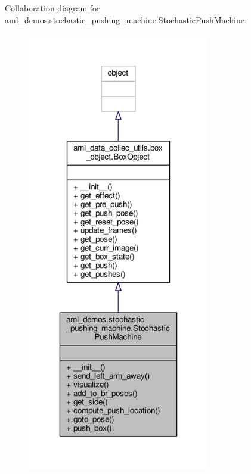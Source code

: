 Collaboration diagram for aml\-\_\-demos.\-stochastic\-\_\-pushing\-\_\-machine.\-Stochastic\-Push\-Machine\-:
\nopagebreak
\begin{figure}[H]
\begin{center}
\leavevmode
\includegraphics[width=226pt]{classaml__demos_1_1stochastic__pushing__machine_1_1_stochastic_push_machine__coll__graph}
\end{center}
\end{figure}
